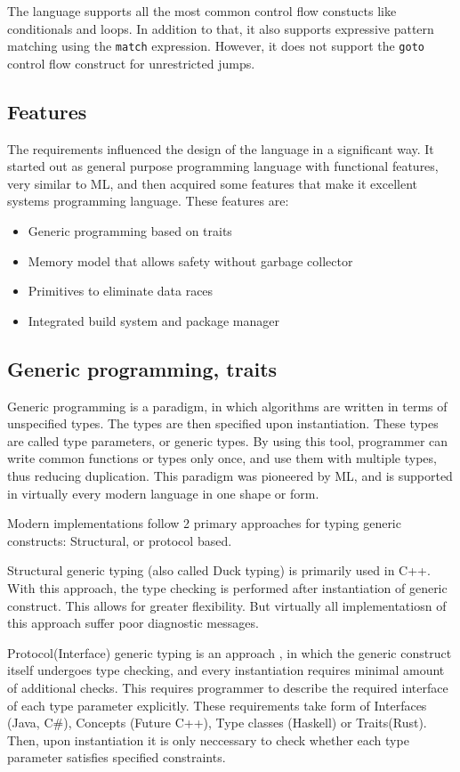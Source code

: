 The language supports all the most common control flow constucts like conditionals and loops. In addition to that, it
also supports expressive pattern matching using the \verb|match| expression. However, it does not support the
\verb|goto| control flow construct for unrestricted jumps.

\subsection{Features}
The requirements influenced the design of the language in a significant way. It started out as general purpose programming
language with functional features, very similar to ML, and then acquired some features that make it excellent
systems programming language. These features are:

\begin{itemize}
    \item Generic programming based on traits
    \item Memory model that allows safety without garbage collector
    \item Primitives to eliminate data races
    \item Integrated build system and package manager
\end{itemize}

\subsection{Generic programming, traits}
Generic programming is a paradigm, in which algorithms are written in terms of unspecified types.
The types are then specified upon instantiation. These types are called type parameters, or generic types.
By using this tool, programmer can write common functions or types only once, and use them with multiple
types, thus reducing duplication. This paradigm was pioneered by ML, and is supported in virtually every
modern language in one shape or form.

Modern implementations follow 2 primary approaches for typing generic constructs: Structural, or protocol based.

Structural generic typing (also called Duck typing) is primarily used in C++. With this approach, the type
checking is performed after instantiation of generic construct. This allows for greater flexibility.
But virtually all implementatiosn of this approach suffer poor diagnostic messages\cite{Traver:2010:CEM:1863617.1945532}.

Protocol(Interface) generic typing is an approach , in which the generic construct itself undergoes type checking, and
every instantiation requires minimal amount of additional checks. This requires programmer to describe the required interface
of each type parameter explicitly. These requirements take form of Interfaces (Java, C\#), Concepts (Future C++),
Type classes (Haskell) or Traits(Rust). Then, upon instantiation it is only neccessary to check whether
each type parameter satisfies specified constraints.

